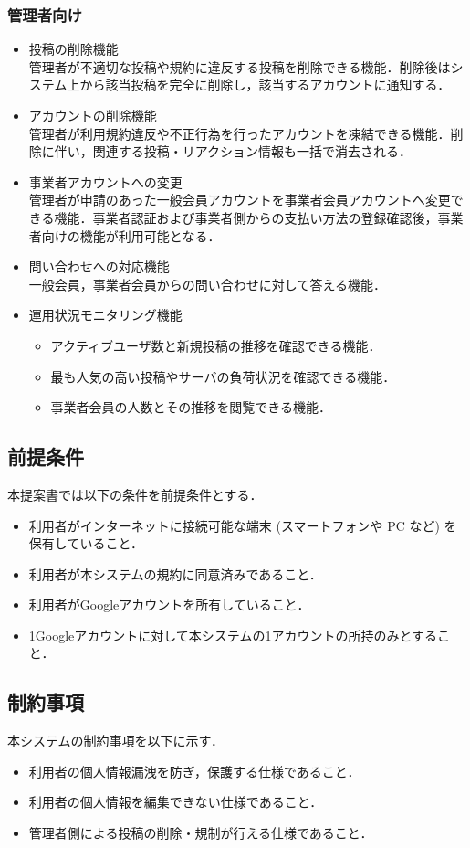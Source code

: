 \subsubsection{管理者向け}
\begin{itemize}[itemsep=10pt]
    \item 投稿の削除機能 \mbox{}\\
    管理者が不適切な投稿や規約に違反する投稿を削除できる機能．削除後はシステム上から該当投稿を完全に削除し，該当するアカウントに通知する．
    \item アカウントの削除機能 \mbox{}\\
    管理者が利用規約違反や不正行為を行ったアカウントを凍結できる機能．削除に伴い，関連する投稿・リアクション情報も一括で消去される．
    \item 事業者アカウントへの変更 \mbox{}\\
    管理者が申請のあった一般会員アカウントを事業者会員アカウントへ変更できる機能．事業者認証および事業者側からの支払い方法の登録確認後，事業者向けの機能が利用可能となる．
    \item 問い合わせへの対応機能 \mbox{} \\
    一般会員，事業者会員からの問い合わせに対して答える機能．
    \item 運用状況モニタリング機能 \mbox{}
    \begin{itemize} [itemsep=10pt]
        \item アクティブユーザ数と新規投稿の推移を確認できる機能．
        \item 最も人気の高い投稿やサーバの負荷状況を確認できる機能．
        \item 事業者会員の人数とその推移を閲覧できる機能．
    \end{itemize}
\end{itemize}

\subsection{前提条件}
本提案書では以下の条件を前提条件とする．
\begin{itemize}
    \item 利用者がインターネットに接続可能な端末 (スマートフォンや PC など) を保有していること．
    \item 利用者が本システムの規約に同意済みであること．
    \item 利用者がGoogleアカウントを所有していること．
    \item 1Googleアカウントに対して本システムの1アカウントの所持のみとすること．
\end{itemize}

\subsection{制約事項}
本システムの制約事項を以下に示す．
\begin{itemize}
    \item 利用者の個人情報漏洩を防ぎ，保護する仕様であること．
    \item 利用者の個人情報を編集できない仕様であること．
    \item 管理者側による投稿の削除・規制が行える仕様であること．
\end{itemize}